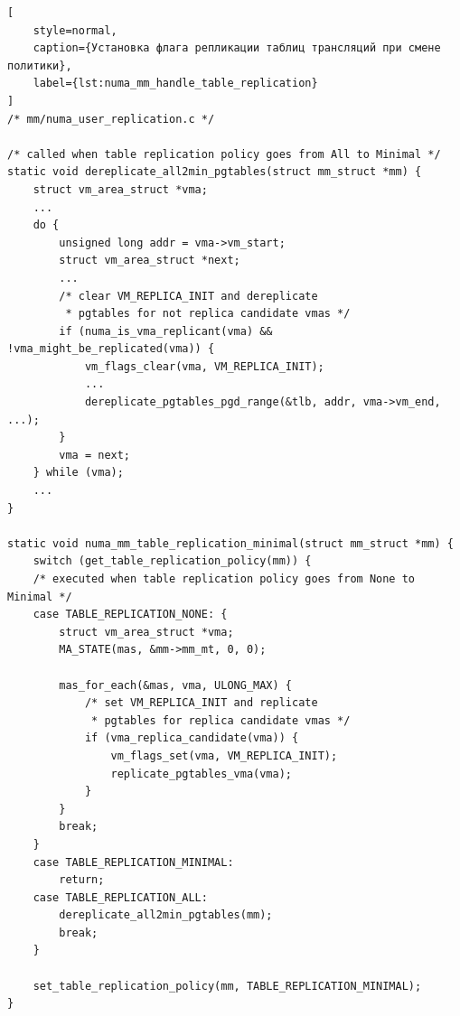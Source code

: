 
\begin{lstlisting}[
    style=normal,
    caption={Установка флага репликации таблиц трансляций при смене политики},
    label={lst:numa_mm_handle_table_replication}
]
/* mm/numa_user_replication.c */

/* called when table replication policy goes from All to Minimal */
static void dereplicate_all2min_pgtables(struct mm_struct *mm) {
	struct vm_area_struct *vma;
    ...
	do {
		unsigned long addr = vma->vm_start;
		struct vm_area_struct *next;
        ...
        /* clear VM_REPLICA_INIT and dereplicate
         * pgtables for not replica candidate vmas */
		if (numa_is_vma_replicant(vma) && !vma_might_be_replicated(vma)) {
			vm_flags_clear(vma, VM_REPLICA_INIT);
			...
			dereplicate_pgtables_pgd_range(&tlb, addr, vma->vm_end, ...);
		}
		vma = next;
	} while (vma);
    ...
}

static void numa_mm_table_replication_minimal(struct mm_struct *mm) {
	switch (get_table_replication_policy(mm)) {
    /* executed when table replication policy goes from None to Minimal */
	case TABLE_REPLICATION_NONE: {
		struct vm_area_struct *vma;
		MA_STATE(mas, &mm->mm_mt, 0, 0);

		mas_for_each(&mas, vma, ULONG_MAX) {
            /* set VM_REPLICA_INIT and replicate
             * pgtables for replica candidate vmas */
			if (vma_replica_candidate(vma)) {
				vm_flags_set(vma, VM_REPLICA_INIT);
				replicate_pgtables_vma(vma);
			}
		}
		break;
	}
	case TABLE_REPLICATION_MINIMAL:
		return;
	case TABLE_REPLICATION_ALL:
		dereplicate_all2min_pgtables(mm);
		break;
	}

	set_table_replication_policy(mm, TABLE_REPLICATION_MINIMAL);
}
\end{lstlisting}
\vspace{0.5cm}


